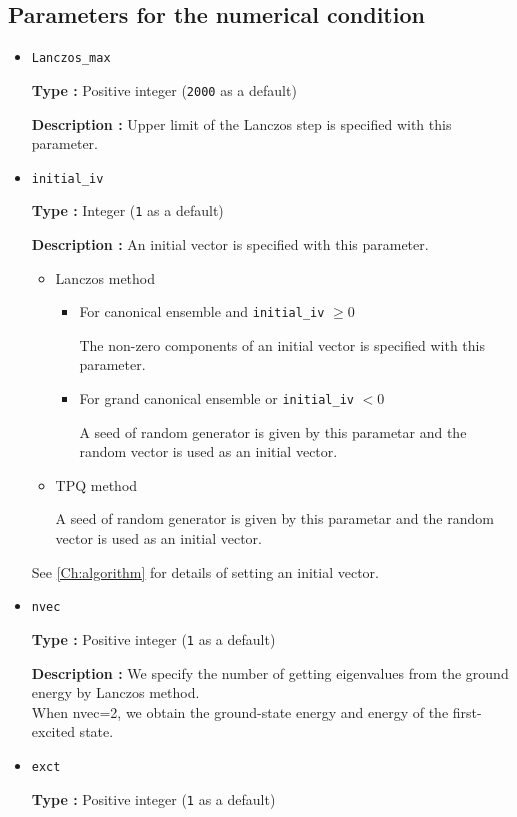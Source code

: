 \subsection{Parameters for the numerical condition}
\begin{itemize}
\item \verb|Lanczos_max|

{\bf Type :} Positive integer (\verb|2000| as a default)

{\bf Description :} Upper limit of the Lanczos step is specified with this parameter.

\item \verb|initial_iv|

{\bf Type :} Integer (\verb|1| as a default)

{\bf Description :} 
{An initial vector is specified with this parameter.}
\begin{itemize}
\item{Lanczos method}
\begin{itemize}
\item{For canonical ensemble and \verb|initial_iv| $\geq 0$}

The non-zero components of an initial vector is specified with this parameter. 

\item{For grand canonical ensemble or \verb|initial_iv| $< 0$}

A seed of random generator is given by this parametar and the random vector is used as an initial vector.
\end{itemize}

\item{TPQ method}

A seed of random generator is given by this parametar and the random vector is used as an initial vector.
\end{itemize}
See \ref{Ch:algorithm} for details of setting an initial vector.

\item \verb|nvec|

{\bf Type :} Positive integer (\verb|1| as a default)

{\bf Description :} We specify the number of getting 
eigenvalues from the ground energy by Lanczos method.\\
When nvec=2, we obtain the ground-state energy and energy of the first-excited state.

\item \verb|exct|

{\bf Type :} Positive integer (\verb|1| as a default)


\end{itemize}
